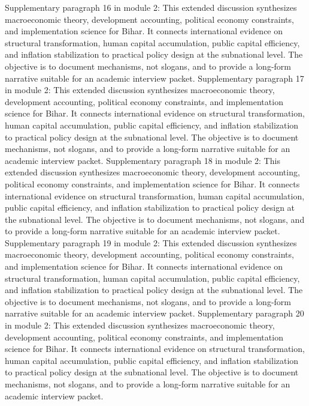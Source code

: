 \documentclass[preprint,12pt]{elsarticle}
\begin{document}
Supplementary paragraph 16 in module 2: This extended discussion synthesizes macroeconomic theory, development accounting, political economy constraints, and implementation science for Bihar. It connects international evidence on structural transformation, human capital accumulation, public capital efficiency, and inflation stabilization to practical policy design at the subnational level. The objective is to document mechanisms, not slogans, and to provide a long-form narrative suitable for an academic interview packet.
Supplementary paragraph 17 in module 2: This extended discussion synthesizes macroeconomic theory, development accounting, political economy constraints, and implementation science for Bihar. It connects international evidence on structural transformation, human capital accumulation, public capital efficiency, and inflation stabilization to practical policy design at the subnational level. The objective is to document mechanisms, not slogans, and to provide a long-form narrative suitable for an academic interview packet.
Supplementary paragraph 18 in module 2: This extended discussion synthesizes macroeconomic theory, development accounting, political economy constraints, and implementation science for Bihar. It connects international evidence on structural transformation, human capital accumulation, public capital efficiency, and inflation stabilization to practical policy design at the subnational level. The objective is to document mechanisms, not slogans, and to provide a long-form narrative suitable for an academic interview packet.
Supplementary paragraph 19 in module 2: This extended discussion synthesizes macroeconomic theory, development accounting, political economy constraints, and implementation science for Bihar. It connects international evidence on structural transformation, human capital accumulation, public capital efficiency, and inflation stabilization to practical policy design at the subnational level. The objective is to document mechanisms, not slogans, and to provide a long-form narrative suitable for an academic interview packet.
Supplementary paragraph 20 in module 2: This extended discussion synthesizes macroeconomic theory, development accounting, political economy constraints, and implementation science for Bihar. It connects international evidence on structural transformation, human capital accumulation, public capital efficiency, and inflation stabilization to practical policy design at the subnational level. The objective is to document mechanisms, not slogans, and to provide a long-form narrative suitable for an academic interview packet.
\end{document}
